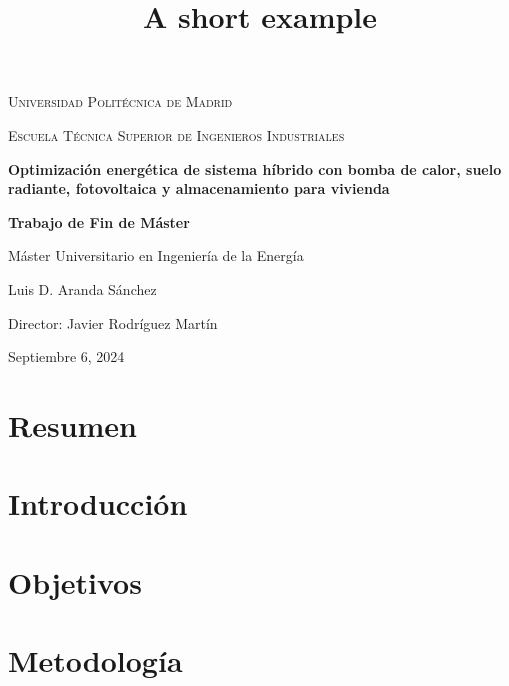 \documentclass[a4paper,11pt,twoside]{report}
\title{A short example}
\begin{document}
\begin{titlepage}
	\centering
	{\scshape\LARGE Universidad Politécnica de Madrid \par}
	\vspace{1cm}
	{\scshape\Large Escuela Técnica Superior de Ingenieros Industriales\par}
	\vspace{1.5cm}
	{\huge\bfseries Optimización energética de sistema híbrido con bomba de calor, suelo radiante, fotovoltaica y almacenamiento para vivienda \par}
	\vspace{1.5cm}
	{\Large\bfseries Trabajo de Fin de Máster\par}
	\vspace{0.5cm}
	{\large Máster Universitario en Ingeniería de la Energía \par}
	\vspace{2cm}
	{\Large Luis D. Aranda Sánchez\par}
	\vfill
	Director: Javier Rodríguez Martín
	\vfill
	{\large Septiembre 6, 2024\par}
\end{titlepage}

\cleardoublepage
\chapter*{Resumen}


\cleardoublepage
\pagestyle{myfancy}
\tableofcontents

\cleardoublepage
\chapter{Introducción}


\cleardoublepage
\chapter{Objetivos}


\cleardoublepage
\chapter{Metodología}

\end{document}
